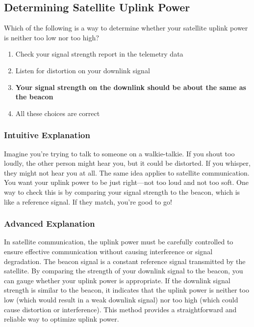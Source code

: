 \subsection{Determining Satellite Uplink Power}
\label{T8B12}

\begin{tcolorbox}[colback=gray!10!white,colframe=black!75!black,title=T8B12]
Which of the following is a way to determine whether your satellite uplink power is neither too low nor too high?
\begin{enumerate}[noitemsep]
    \item Check your signal strength report in the telemetry data
    \item Listen for distortion on your downlink signal
    \item \textbf{Your signal strength on the downlink should be about the same as the beacon}
    \item All these choices are correct
\end{enumerate}
\end{tcolorbox}

\subsubsection*{Intuitive Explanation}
Imagine you're trying to talk to someone on a walkie-talkie. If you shout too loudly, the other person might hear you, but it could be distorted. If you whisper, they might not hear you at all. The same idea applies to satellite communication. You want your uplink power to be just right—not too loud and not too soft. One way to check this is by comparing your signal strength to the beacon, which is like a reference signal. If they match, you're good to go!

\subsubsection*{Advanced Explanation}
In satellite communication, the uplink power must be carefully controlled to ensure effective communication without causing interference or signal degradation. The beacon signal is a constant reference signal transmitted by the satellite. By comparing the strength of your downlink signal to the beacon, you can gauge whether your uplink power is appropriate. If the downlink signal strength is similar to the beacon, it indicates that the uplink power is neither too low (which would result in a weak downlink signal) nor too high (which could cause distortion or interference). This method provides a straightforward and reliable way to optimize uplink power.